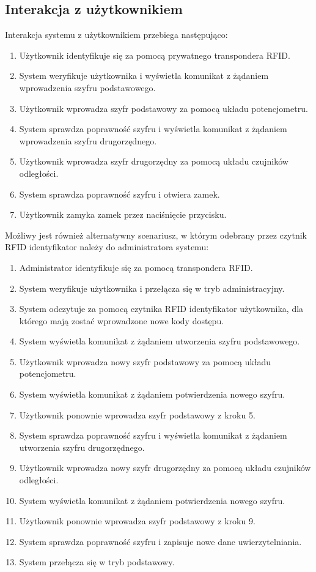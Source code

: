 \documentclass[polish,polish,a4paper]{article}
\begin{document}
	\subsection{Interakcja z użytkownikiem}
	\label{scenario}
	Interakcja systemu z użytkownikiem przebiega następująco:
	\begin{enumerate}
		\item Użytkownik identyfikuje się za pomocą prywatnego transpondera RFID.
		\item System weryfikuje użytkownika i wyświetla komunikat z żądaniem wprowadzenia szyfru podstawowego.
		\item Użytkownik wprowadza szyfr podstawowy za pomocą układu potencjometru.
		\item System sprawdza poprawność szyfru i wyświetla komunikat z żądaniem wprowadzenia szyfru drugorzędnego.
		\item Użytkownik wprowadza szyfr drugorzędny za pomocą układu czujników odległości.
		\item System sprawdza poprawność szyfru i otwiera zamek.
		\item Użytkownik zamyka zamek przez naciśnięcie przycisku.
	\end{enumerate}
	Możliwy jest również alternatywny scenariusz, w którym odebrany przez czytnik RFID identyfikator należy do administratora systemu:
	\begin{enumerate}
		\item Administrator identyfikuje się za pomocą transpondera RFID.
		\item System weryfikuje użytkownika i przełącza się w tryb administracyjny.
		\item System odczytuje za pomocą czytnika RFID identyfikator użytkownika, dla którego mają zostać wprowadzone nowe kody dostępu.
		\item System wyświetla komunikat z żądaniem utworzenia szyfru podstawowego.
		\item Użytkownik wprowadza nowy szyfr podstawowy za pomocą układu potencjometru.
		\item System wyświetla komunikat z żądaniem potwierdzenia nowego szyfru.
		\item Użytkownik ponownie wprowadza szyfr podstawowy z kroku 5.
		\item System sprawdza poprawność szyfru i wyświetla komunikat z żądaniem utworzenia szyfru drugorzędnego.
		\item Użytkownik wprowadza nowy szyfr drugorzędny za pomocą układu czujników odległości.
		\item System wyświetla komunikat z żądaniem potwierdzenia nowego szyfru.
		\item Użytkownik ponownie wprowadza szyfr podstawowy z kroku 9.
		\item System sprawdza poprawność szyfru i zapisuje nowe dane uwierzytelniania.
		\item System przełącza się w tryb podstawowy.
	\end{enumerate}
\end{document}
